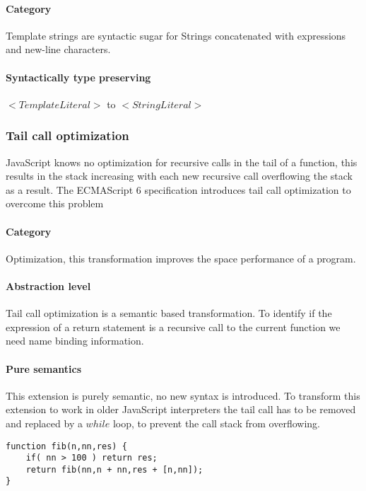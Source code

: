 \paragraph{Category}
Template strings are syntactic sugar for Strings concatenated with expressions and new-line characters.

\paragraph{Syntactically type preserving}
$<TemplateLiteral>$ to $<StringLiteral>$

\subsubsection{Tail call optimization}
JavaScript knows no optimization for recursive calls in the tail of a function, this results in the stack increasing with each new recursive call overflowing the stack as a result.  The ECMAScript 6 specification introduces tail call optimization to overcome this problem\cite[14.6]{SpecJS}

\paragraph{Category}
Optimization, this transformation improves the space performance of a program.

\paragraph{Abstraction level}
Tail call optimization is a semantic based transformation. To identify if the expression of a return statement is a recursive call to the current function we need name binding information.

\paragraph{Pure semantics}
This extension is purely semantic, no new syntax is introduced. To transform this extension to work in older JavaScript interpreters the tail call has to be removed and replaced by a $while$ loop, to prevent the call stack from overflowing.

\begin{lstlisting}[caption={Function with tail recursion},label={lst:tail-call}]
function fib(n,nn,res) {
	if( nn > 100 ) return res;
	return fib(nn,n + nn,res + [n,nn]);
}
\end{lstlisting}


